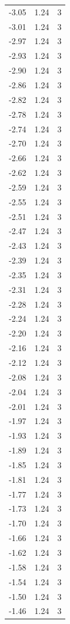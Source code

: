 \begin{longtable}{lrr}
  -3.05 & 1.24 & 3 \\
  -3.01 & 1.24 & 3 \\
  -2.97 & 1.24 & 3 \\
  -2.93 & 1.24 & 3 \\
  -2.90 & 1.24 & 3 \\
  -2.86 & 1.24 & 3 \\
  -2.82 & 1.24 & 3 \\
  -2.78 & 1.24 & 3 \\
  -2.74 & 1.24 & 3 \\
  -2.70 & 1.24 & 3 \\
  -2.66 & 1.24 & 3 \\
  -2.62 & 1.24 & 3 \\
  -2.59 & 1.24 & 3 \\
  -2.55 & 1.24 & 3 \\
  -2.51 & 1.24 & 3 \\
  -2.47 & 1.24 & 3 \\
  -2.43 & 1.24 & 3 \\
  -2.39 & 1.24 & 3 \\
  -2.35 & 1.24 & 3 \\
  -2.31 & 1.24 & 3 \\
  -2.28 & 1.24 & 3 \\
  -2.24 & 1.24 & 3 \\
  -2.20 & 1.24 & 3 \\
  -2.16 & 1.24 & 3 \\
  -2.12 & 1.24 & 3 \\
  -2.08 & 1.24 & 3 \\
  -2.04 & 1.24 & 3 \\
  -2.01 & 1.24 & 3 \\
  -1.97 & 1.24 & 3 \\
  -1.93 & 1.24 & 3 \\
  -1.89 & 1.24 & 3 \\
  -1.85 & 1.24 & 3 \\
  -1.81 & 1.24 & 3 \\
  -1.77 & 1.24 & 3 \\
  -1.73 & 1.24 & 3 \\
  -1.70 & 1.24 & 3 \\
  -1.66 & 1.24 & 3 \\
  -1.62 & 1.24 & 3 \\
  -1.58 & 1.24 & 3 \\
  -1.54 & 1.24 & 3 \\
  -1.50 & 1.24 & 3 \\
  -1.46 & 1.24 & 3 \\

\end{longtable}
